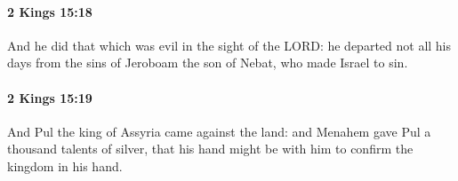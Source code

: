 		\paragraph{2 Kings 15:18} %
			\label{2KINGS-15-18}

			And he did that which was evil in the sight of the LORD: he departed not all his days from the sins of Jeroboam the son of Nebat, who made Israel to sin.


		\paragraph{2 Kings 15:19} %
			\label{2KINGS-15-19}

			And Pul the king of Assyria came against the land: and Menahem gave Pul a thousand talents of silver, that his hand might be with him to confirm the kingdom in his hand.



